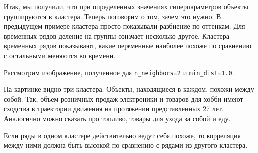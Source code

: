 Итак, мы получили, что при определенных значениях гиперпараметров объекты группируются в кластера. Теперь поговорим о том, зачем это нужно. В предыдущем примере кластера просто показывали разбиение по оттенкам. Для временных рядов деление на группы означает несколько другое. Кластера временных рядов показывают, какие переменные наиболее похоже по сравнению с остальными меняются во времени.
\newpage
\begin{multicols}{2}
	
	Рассмотрим изображение, полученное для \verb|n_neighbors=2| и \verb|min_dist=1.0|.
	
	На картинке видно три кластера. Объекты, находящиеся в каждом, похожи между собой. Так, объем розничных продаж электроники и товаров для хобби имеют сходства в траектории движения на протяжении представленных 27 лет. Аналогично можно сказать про топливо, товары для ухода за собой и еду.
	
	Если ряды в одном кластере действительно ведут себя похоже, то корреляция между ними должна быть высокой по сравнению с рядами из другого кластера.
\end{multicols}
\begin{figure}[H]
	\noindent {}
\end{figure}

